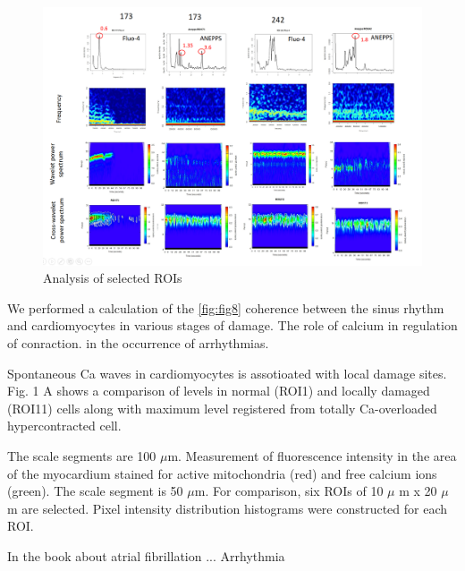 \documentclass{biophys-new}
\begin{document}
\begin{figure}[hbt!]
\centering
\includegraphics[width=0.9\linewidth]{fig11.png}
\caption{ Analysis of selected ROIs }
\label{fig:fig11}
\end{figure}


We performed a calculation of the \ref{fig:fig8} coherence between the sinus rhythm and cardiomyocytes in various stages of damage.
The role of calcium in regulation of conraction.
in the occurrence of arrhythmias.


Spontaneous Ca waves in cardiomyocytes is assotioated with local damage sites.
Fig. 1 A shows a comparison of  levels in normal (ROI1) and locally damaged (ROI11) cells along with maximum  level registered from totally Ca-overloaded hypercontracted cell.


The scale segments are 100 $\mu$m.
Measurement of fluorescence intensity in the area of the myocardium stained for active mitochondria (red) and free calcium ions (green).
The scale segment is 50 $\mu$m.
For comparison, six ROIs of 10 $\mu$ m x 20 $\mu$ m are selected.
Pixel intensity distribution histograms were constructed for each ROI.


In the book \cite{kockskamper2002subcellular} about atrial fibrillation ...
Arrhythmia



\end{document}
